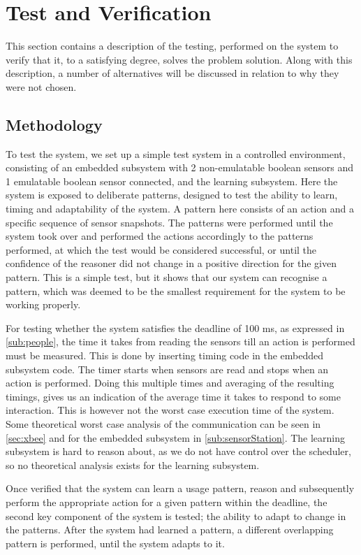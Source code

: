 \chapter{Test and Verification}
This section contains a description of the testing, performed on the system to verify that it, to a satisfying degree, solves the problem solution. Along with this description, a number of alternatives will be discussed in relation to why they were not chosen.

\section{Methodology}
To test the system, we set up a simple test system in a controlled environment, consisting of an embedded subsystem with 2 non-emulatable boolean sensors and 1 emulatable boolean sensor connected, and the learning subsystem. Here the system is exposed to deliberate patterns, designed to test the ability to learn, timing and adaptability of the system. A pattern here consists of an action and a specific sequence of sensor snapshots. The patterns were performed until the system took over and performed the actions accordingly to the patterns performed, at which the test would be considered successful, or until the confidence of the reasoner did not change in a positive direction for the given pattern. This is a simple test, but it shows that our system can recognise a pattern, which was deemed to be the smallest requirement for the system to be working properly.

For testing whether the system satisfies the deadline of 100 ms, as expressed in \cref{sub:people}, the time it takes from reading the sensors till an action is performed must be measured. This is done by inserting timing code in the embedded subsystem code. The timer starts when sensors are read and stops when an action is performed. Doing this multiple times and averaging of the resulting timings, gives us an indication of the average time it takes to respond to some interaction. This is however not the worst case execution time of the system. Some theoretical worst case analysis of the communication can be seen in \cref{sec:xbee} and for the embedded subsystem in \cref{sub:sensorStation}. The learning subsystem is hard to reason about, as we do not have control over the scheduler, so no theoretical analysis exists for the learning subsystem.

Once verified that the system can learn a usage pattern, reason and subsequently perform the appropriate action for a given pattern within the deadline, the second key component of the system is tested; the ability to adapt to change in the patterns. After the system had learned a pattern, a different overlapping pattern is performed, until the system adapts to it.

